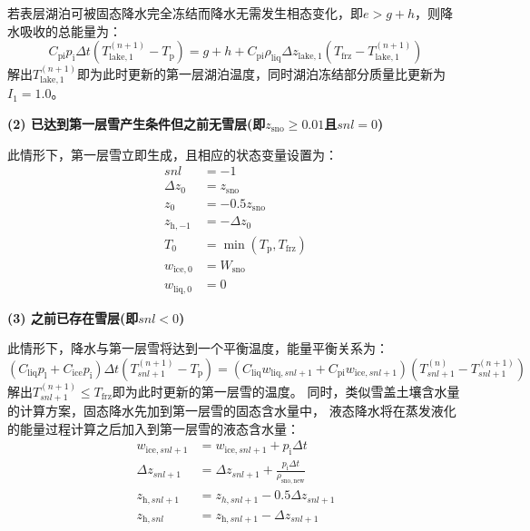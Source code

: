 若表层湖泊可被固态降水完全冻结而降水无需发生相态变化，即$e>g+h$，则降水吸收的总能量为：
\begin{equation}
  C_{\mathrm{p i}} p_{\mathrm{i}} \Delta t\left(T_{\mathrm{lake, 1}}^{(n+1)}-T_{\mathrm{p}}\right)=g+h+C_{\mathrm{p i}} \rho_{\mathrm{liq}} \Delta z_{\mathrm{lake, 1}}
  \left(T_{\mathrm {frz}}-T_{\mathrm{lake,1}}^{(n+1)}\right)
\end{equation}
解出$T_{\mathrm{lake,1}}^{\left(n+1\right)}$即为此时更新的第一层湖泊温度，同时湖泊冻结部分质量比更新为$I_1=1.0$。


\noindent\textbf {(2) 已达到第一层雪产生条件但之前无雪层(即$z_{\mathrm{sno}}\geqslant 0.01$且$snl=0$)}

此情形下，第一层雪立即生成，且相应的状态变量设置为：
\begin{equation}
  \begin{aligned}
    snl &= -1 \\
    \Delta z_{0} &= z_{\mathrm{sno}} \\
    z_{0} &= -0.5 z_{\mathrm{sno}} \\
    z_{\mathrm{h,-1}} &= -\Delta z_{0} \\
    T_{0} &= \min \left(T_{\mathrm{p}}, T_{\mathrm {frz}}\right) \\
    w_{\mathrm{ice, 0}} &= W_{\mathrm{sno}} \\
    w_{\mathrm{liq, 0}} &= 0
  \end{aligned}
\end{equation}


\noindent\textbf {(3) 之前已存在雪层(即$snl<0$)}

此情形下，降水与第一层雪将达到一个平衡温度，能量平衡关系为：
\begin{equation}
  \left(C_{\mathrm{liq}} p_{\mathrm{l}}+C_{\mathrm{ice}} p_{\mathrm{i}}\right) \Delta t\left(T_{snl+1}^{(n+1)}-T_{\mathrm{p}}\right)=
  \left(C_{\mathrm{liq}} w_{\mathrm{liq},snl+1}+C_{\mathrm{p i}} w_{\mathrm{ice},snl+1}\right)\left(T_{snl+1}^{(n)}-T_{snl+1}^{(n+1)}\right)
\end{equation}
解出$T_{snl+1}^{\left(n+1\right)}\leqslant T_{\mathrm {frz}} $即为此时更新的第一层雪的温度。
同时，类似雪盖土壤含水量的计算方案，固态降水先加到第一层雪的固态含水量中，
液态降水将在蒸发液化的能量过程计算之后加入到第一层雪的液态含水量：
\begin{equation}
  \begin{aligned}
    w_{\mathrm{ice},snl+1} &=  w_{\mathrm{ice},snl+1}+p_{\mathrm{i}} \Delta t \\
    \Delta z_{snl+1} &= \Delta z_{snl+1}+\frac{p_{\mathrm{i}} \Delta t}{\rho_{\mathrm{sno,new}}} \\
    z_{\mathrm{h},snl+1} &= z_{h,snl+1}-0.5 \Delta z_{snl+1} \\
    z_{\mathrm{h}, snl} &= z_{\mathrm{h},snl+1}-\Delta z_{snl+1}
  \end{aligned}
\end{equation}



